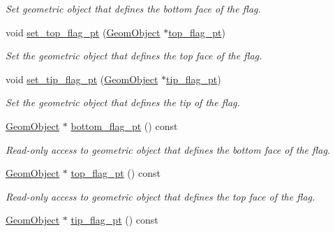 \begin{DoxyCompactItemize}
\begin{DoxyCompactList}\small\item\em Set geometric object that defines the bottom face of the flag. \end{DoxyCompactList}\item 
void \hyperlink{classoomph_1_1AlgebraicCylinderWithFlagMesh_a9d7f04acdaed3e9f2133d9665dd4b799}{set\+\_\+top\+\_\+flag\+\_\+pt} (\hyperlink{classoomph_1_1GeomObject}{Geom\+Object} $\ast$\hyperlink{classoomph_1_1AlgebraicCylinderWithFlagMesh_a06bc13adad4aaa037d989bba9e3bf79d}{top\+\_\+flag\+\_\+pt})
\begin{DoxyCompactList}\small\item\em Set the geometric object that defines the top face of the flag. \end{DoxyCompactList}\item 
void \hyperlink{classoomph_1_1AlgebraicCylinderWithFlagMesh_a191d736d9acbeb5927fc5f472420e9f6}{set\+\_\+tip\+\_\+flag\+\_\+pt} (\hyperlink{classoomph_1_1GeomObject}{Geom\+Object} $\ast$\hyperlink{classoomph_1_1AlgebraicCylinderWithFlagMesh_ad6d22aaa02d79e3c740b06d98a1597ea}{tip\+\_\+flag\+\_\+pt})
\begin{DoxyCompactList}\small\item\em Set the geometric object that defines the tip of the flag. \end{DoxyCompactList}\item 
\hyperlink{classoomph_1_1GeomObject}{Geom\+Object} $\ast$ \hyperlink{classoomph_1_1AlgebraicCylinderWithFlagMesh_a9c362fcc5edeb1b6e773f27a83778495}{bottom\+\_\+flag\+\_\+pt} () const
\begin{DoxyCompactList}\small\item\em Read-\/only access to geometric object that defines the bottom face of the flag. \end{DoxyCompactList}\item 
\hyperlink{classoomph_1_1GeomObject}{Geom\+Object} $\ast$ \hyperlink{classoomph_1_1AlgebraicCylinderWithFlagMesh_a06bc13adad4aaa037d989bba9e3bf79d}{top\+\_\+flag\+\_\+pt} () const
\begin{DoxyCompactList}\small\item\em Read-\/only access to geometric object that defines the top face of the flag. \end{DoxyCompactList}\item 
\hyperlink{classoomph_1_1GeomObject}{Geom\+Object} $\ast$ \hyperlink{classoomph_1_1AlgebraicCylinderWithFlagMesh_ad6d22aaa02d79e3c740b06d98a1597ea}{tip\+\_\+flag\+\_\+pt} () const

\end{DoxyCompactItemize}
